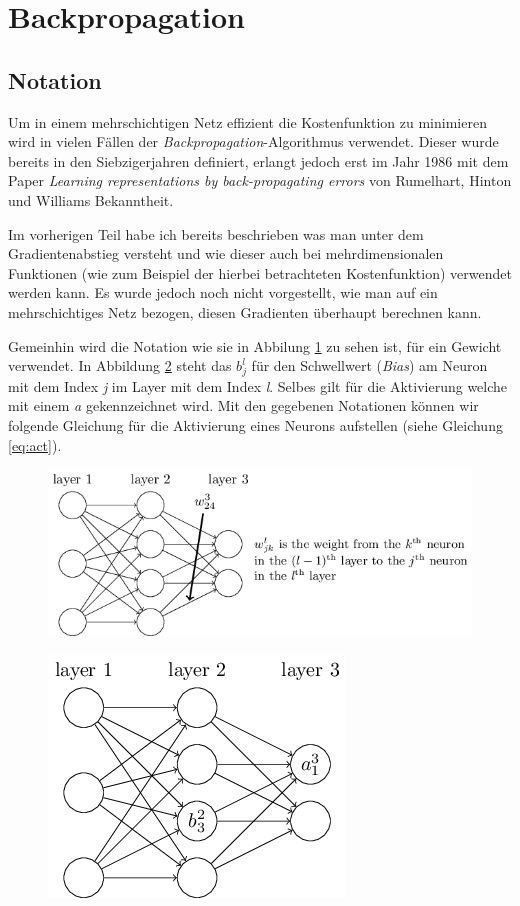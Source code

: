 \section{Backpropagation}

\subsection{Notation}

Um in einem mehrschichtigen Netz effizient die Kostenfunktion zu minimieren wird in vielen Fällen der \emph{Backpropagation}-Algorithmus verwendet. Dieser wurde bereits in den Siebzigerjahren definiert, erlangt jedoch erst im Jahr 1986 mit dem Paper \emph{Learning representations by back-propagating errors} von Rumelhart, Hinton und Williams Bekanntheit. 

Im vorherigen Teil habe ich bereits beschrieben was man unter dem Gradientenabstieg versteht und wie dieser auch bei mehrdimensionalen Funktionen (wie zum Beispiel der hierbei betrachteten Kostenfunktion) verwendet werden kann. Es wurde jedoch noch nicht vorgestellt, wie man auf ein mehrschichtiges Netz bezogen, diesen Gradienten überhaupt berechnen kann. 

Gemeinhin wird die Notation wie sie in Abbilung \ref{fig:weight_not} zu sehen ist, für ein Gewicht verwendet. In Abbildung \ref{fig:biasAct_not} steht das $b^l_j$ für den Schwellwert (\emph{Bias}) am Neuron mit dem Index \emph{j} im Layer mit dem Index \emph{l}. Selbes gilt für die Aktivierung welche mit einem \emph{a} gekennzeichnet wird. Mit den gegebenen Notationen können wir folgende Gleichung für die Aktivierung eines Neurons aufstellen (siehe Gleichung \ref{eq:act}). 

\begin{figure}[!htb]
	\centering
	\includegraphics[width=\linewidth]{img/weight_notation}
	\label{fig:weight_not}
\end{figure}

\begin{figure}[!htb]
	\centering
	\includegraphics[width=.4\linewidth]{img/biasAct_notation}
	\label{fig:biasAct_not}
\end{figure}

